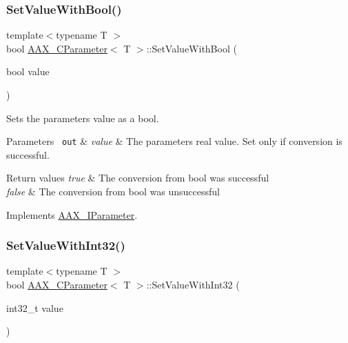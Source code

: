 \subsubsection{\texorpdfstring{SetValueWithBool()}{SetValueWithBool()}\hspace{0.1cm}{\footnotesize\ttfamily [1/2]}}
{\footnotesize\ttfamily template$<$typename T $>$ \\
bool \mbox{\hyperlink{a01537}{A\+A\+X\+\_\+\+C\+Parameter}}$<$ T $>$\+::Set\+Value\+With\+Bool (\begin{DoxyParamCaption}\item[{bool}]{value }\end{DoxyParamCaption})\hspace{0.3cm}{\ttfamily [virtual]}}



Sets the parameter\textquotesingle{}s value as a bool. 


\begin{DoxyParams}[1]{Parameters}
\mbox{\texttt{ out}}  & {\em value} & The parameter\textquotesingle{}s real value. Set only if conversion is successful.\\
\hline
\end{DoxyParams}

\begin{DoxyRetVals}{Return values}
{\em true} & The conversion from bool was successful \\
\hline
{\em false} & The conversion from bool was unsuccessful \\
\hline
\end{DoxyRetVals}


Implements \mbox{\hyperlink{a01857_ae925146da822a568029ff295006152e2}{A\+A\+X\+\_\+\+I\+Parameter}}.

\mbox{\label{a01537_aaf45f020a267f894429b4a75ddbe9c6c}} 
\subsubsection{\texorpdfstring{SetValueWithInt32()}{SetValueWithInt32()}\hspace{0.1cm}{\footnotesize\ttfamily [1/2]}}
{\footnotesize\ttfamily template$<$typename T $>$ \\
bool \mbox{\hyperlink{a01537}{A\+A\+X\+\_\+\+C\+Parameter}}$<$ T $>$\+::Set\+Value\+With\+Int32 (\begin{DoxyParamCaption}\item[{int32\+\_\+t}]{value }\end{DoxyParamCaption})\hspace{0.3cm}{\ttfamily [virtual]}}



